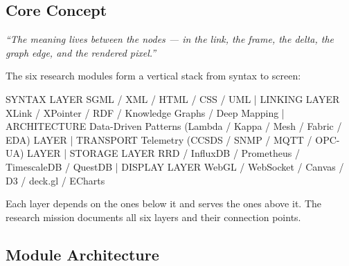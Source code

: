 \documentclass[11pt,letterpaper]{article}
\begin{document}
\subsection{Core Concept}

\begin{center}
\textit{``The meaning lives between the nodes --- in the link, the frame, the delta, the graph edge, and the rendered pixel.''}
\end{center}

The six research modules form a vertical stack from syntax to screen:

\begin{asciibox}
SYNTAX LAYER      SGML / XML / HTML / CSS / UML
                       |
LINKING LAYER     XLink / XPointer / RDF / Knowledge Graphs / Deep Mapping
                       |
ARCHITECTURE      Data-Driven Patterns (Lambda / Kappa / Mesh / Fabric / EDA)
LAYER                  |
TRANSPORT         Telemetry (CCSDS / SNMP / MQTT / OPC-UA)
LAYER                  |
STORAGE LAYER     RRD / InfluxDB / Prometheus / TimescaleDB / QuestDB
                       |
DISPLAY LAYER     WebGL / WebSocket / Canvas / D3 / deck.gl / ECharts
\end{asciibox}

Each layer depends on the ones below it and serves the ones above it. The research mission documents all six layers and their connection points.

\subsection{Module Architecture}
\end{document}
